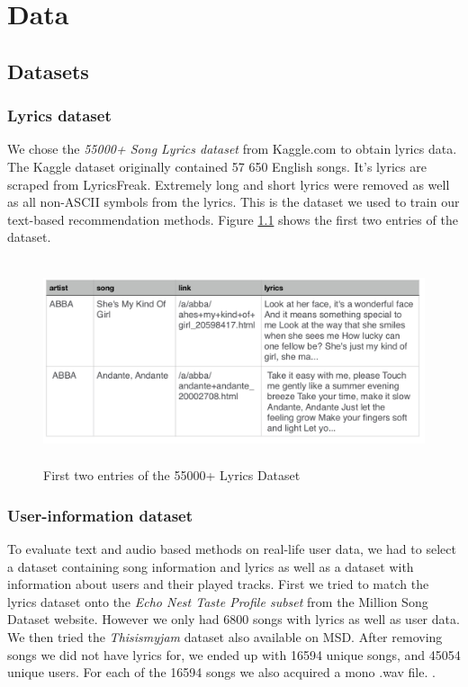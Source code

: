 \chapter{Data}

\section{Datasets}

\subsection{Lyrics dataset}
 We chose the \textit{55000+ Song Lyrics dataset} from Kaggle.com to obtain lyrics data. The Kaggle dataset originally contained 57 650 English songs. It’s lyrics are scraped from LyricsFreak. Extremely long and short lyrics were removed as well as all non-ASCII symbols from the lyrics. This is the dataset we used to train our text-based recommendation methods. Figure \ref{fig:lyrics_dataset} shows the first two entries of the dataset.\\
 \begin{figure}[h]
    \centering
	\includegraphics[height=60mm]{./img/dataset_preview.png}
	\caption{First two entries of the 55000+ Lyrics Dataset}
	\label{fig:lyrics_dataset}
\end{figure}

\subsection{User-information dataset}
To evaluate text and audio based methods on real-life user data, we had to select a dataset containing song information and lyrics as well as a dataset with information about users and their played tracks. First we tried to match the lyrics dataset onto the \textit{Echo Nest Taste Profile subset} from the Million Song Dataset website. However we only had 6800 songs with lyrics as well as user data.  We then tried the \textit{Thisismyjam} dataset also available on MSD. After removing songs we did not have lyrics for, we ended up with 16594 unique songs, and 45054 unique users. For each of the 16594 songs we also acquired a mono .wav file. . \\


